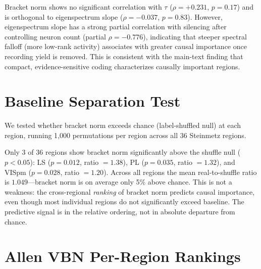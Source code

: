 \documentclass{article}
\begin{document}
Bracket norm shows no significant correlation with $\tau$ ($\rho = +0.231$, $p = 0.17$) and is orthogonal to eigenspectrum slope ($\rho = -0.037$, $p = 0.83$). However, eigenspectrum slope has a strong partial correlation with silencing after controlling neuron count (partial $\rho = -0.776$), indicating that steeper spectral falloff (more low-rank activity) associates with greater causal importance once recording yield is removed. This is consistent with the main-text finding that compact, evidence-sensitive coding characterizes causally important regions.

\section{Baseline Separation Test}
\label{app:baseline}

We tested whether bracket norm exceeds chance (label-shuffled null) at each region, running 1{,}000 permutations per region across all 36 Steinmetz regions.

Only 3 of 36 regions show bracket norm significantly above the shuffle null ($p < 0.05$): LS ($p = 0.012$, ratio $= 1.38$), PL ($p = 0.035$, ratio $= 1.32$), and VISpm ($p = 0.028$, ratio $= 1.20$). Across all regions the mean real-to-shuffle ratio is $1.049$---bracket norm is on average only 5\% above chance. This is not a weakness: the cross-regional \emph{ranking} of bracket norm predicts causal importance, even though most individual regions do not significantly exceed baseline. The predictive signal is in the relative ordering, not in absolute departure from chance.

\section{Allen VBN Per-Region Rankings}
\label{app:vbn}
\end{document}

